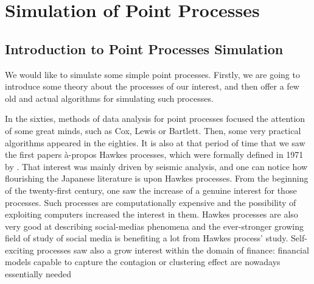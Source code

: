 \documentclass[11pt]{book}
\begin{document}
\frontmatter
\pagestyle{front}


\newpage




\thispagestyle{empty}%

                                                                







\mainmatter
\pagestyle{main}





\part{Simulation of Point Processes}
\chapter{Introduction to Point Processes Simulation}
We would like to simulate some simple point processes. Firstly, we are going to introduce some theory about the processes of our interest, and then offer a few old and actual algorithms for simulating such processes. 

In the sixties, methods of data analysis for point processes focused the attention of some great minds, such as Cox, Lewis or Bartlett. Then, some very practical algorithms appeared in the eighties. It is also at that period of time that we saw the first papers à-propos Hawkes processes, which were formally defined in 1971 by \cite{Hawkes}. That interest was mainly driven by seismic analysis, and one can notice how flourishing the Japanese literature is upon Hawkes processes. From the beginning of the twenty-first century, one saw the increase of a genuine interest for those processes. Such processes are computationally expensive and the possibility of exploiting computers increased the interest in them. Hawkes processes are also very good at describing social-medias phenomena and the ever-stronger growing field of study of social media is benefiting a lot from Hawkes process' study. Self-exciting processes saw also a grow interest within the domain of finance: financial models capable to capture the contagion or clustering effect are nowadays essentially needed
\end{document}
